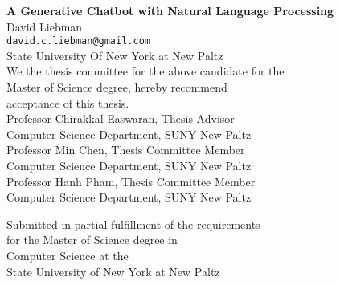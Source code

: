 \documentclass[notitlepage]{report}
\begin{document}
\begin{center}
	\textbf{\large A Generative Chatbot with Natural Language Processing} \\
	David Liebman \\
	\texttt{david.c.liebman@gmail.com} \\
	State University Of New York at New Paltz \\
	\vspace{1cm}
	\vspace{1cm}
	We the thesis committee for the above candidate for the \\
	Master of Science degree, hereby recommend \\
	acceptance of this thesis. \\
		\vspace{1cm}
		\vspace{1cm}
	Professor Chirakkal Easwaran, Thesis Advisor \\
	Computer Science Department, SUNY New Paltz\\
		\vspace{1cm}
		\vspace{1cm}
	Professor Min Chen, Thesis Committee Member \\
	Computer Science Department, SUNY New Paltz \\
		\vspace{1cm}
		\vspace{1cm}
	Professor Hanh Pham, Thesis Committee Member \\
	Computer Science Department, SUNY New Paltz \\
		\vspace{1cm}
		\vspace{1cm}
\end{center}



\begin{center}
	Submitted in partial fulfillment of the requirements \\
	for the Master of Science degree in \\
	Computer Science at the \\
	State University of New York at New Paltz \\
\end{center}


\newpage


\end{document}
